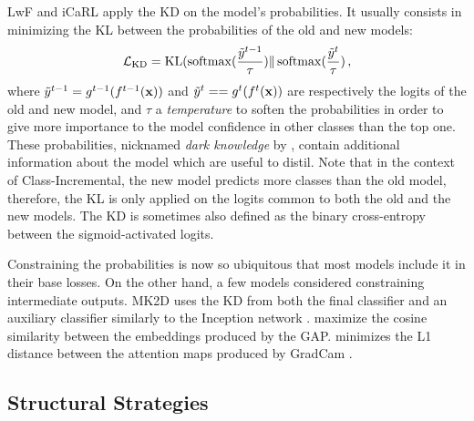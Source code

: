 LwF \citep{li2018lwf} and iCaRL \citep{rebuffi2017icarl} apply the \ac{KD}
\citep{hinton2015knowledge_distillation} on the model's probabilities. It usually consists in
minimizing the \ac{KL} between the probabilities of the old and new models:
%
\begin{equation}
      \mathcal{L}_\text{KD} = \operatorname{KL}(\operatorname{softmax}(\frac{\tilde{y}^{t-1}}{\tau}) \Vert \operatorname{softmax}(\frac{\tilde{y}^t}{\tau})\,,
\end{equation}
%
where $\tilde{y}^{t-1} = g^{t-1} (f^{t-1}(\mathbf{x}))$ and $\tilde{y}^{t} = = g^{t} (f^{t}(\mathbf{x}))$ are respectively the logits of the old and new model,
and $\tau$ a \textit{temperature} to soften the probabilities in order to give more importance to
the model confidence in other classes than the top one. These probabilities, nicknamed \textit{dark
      knowledge} by \cite{hinton2015knowledge_distillation}, contain additional information about the
model which are useful to distil. Note that in the context of Class-Incremental, the new model
predicts more classes than the old model, therefore, the \ac{KL} is only applied on the logits
common to both the old and the new models. The \ac{KD} is sometimes also defined as the binary
cross-entropy between the sigmoid-activated logits.

Constraining the probabilities is now so ubiquitous that most models include it in their base
losses. On the other hand, a few models considered constraining intermediate outputs. MK2D
\citep{peng2019m2kd} uses the \ac{KD} from both the final classifier and an auxiliary classifier
similarly to the Inception network \citep{szegedy2015inception}. \cite{hou2019ucir} maximize the
cosine similarity between the embeddings produced by the \ac{GAP}.
\cite{dhar2019learning_without_memorizing_gradcam} minimizes the L1 distance between the attention
maps produced by GradCam \citep{selvaraju2017gradcam}.

\subsection{Structural Strategies}
\label{sec:related_structural}

